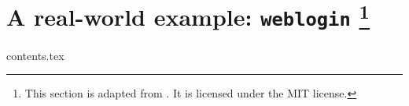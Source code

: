 \chapter{A real-world example: \texttt{weblogin}%
  \protected\footnote{This section is adapted from \cite{weblogin}.
                      It is licensed under the MIT license.}}
{contents.tex}


